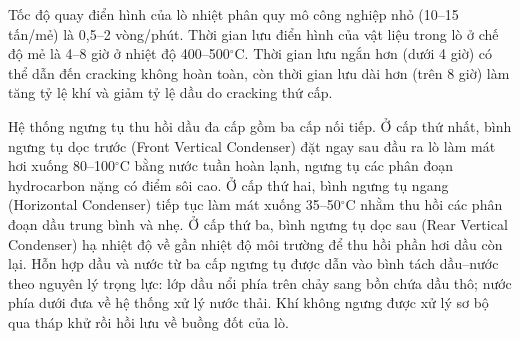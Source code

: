 \documentclass[../main.tex]{subfiles}
\begin{document}
Tốc độ quay điển hình của lò nhiệt phân quy mô công nghiệp nhỏ (10--15 tấn/mẻ) là 0,5--2 vòng/phút. Thời gian lưu điển hình của vật liệu trong lò ở chế độ mẻ là 4--8 giờ ở nhiệt độ 400--500$^\circ\mathrm{C}$. Thời gian lưu ngắn hơn (dưới 4 giờ) có thể dẫn đến cracking không hoàn toàn, còn thời gian lưu dài hơn (trên 8 giờ) làm tăng tỷ lệ khí và giảm tỷ lệ dầu do cracking thứ cấp.

\begin{table}[H]
\centering
\caption{Thông số thiết kế lò nhiệt phân quay}
\label{tab:thong-so-lo-nhiet-phan-quay}
\setlength{\tabcolsep}{5pt}
\end{table}

Hệ thống ngưng tụ thu hồi dầu đa cấp gồm ba cấp nối tiếp. Ở cấp thứ nhất, bình ngưng tụ dọc trước (Front Vertical Condenser) đặt ngay sau đầu ra lò làm mát hơi xuống 80--100$^\circ\mathrm{C}$ bằng nước tuần hoàn lạnh, ngưng tụ các phân đoạn hydrocarbon nặng có điểm sôi cao. Ở cấp thứ hai, bình ngưng tụ ngang (Horizontal Condenser) tiếp tục làm mát xuống 35--50$^\circ\mathrm{C}$ nhằm thu hồi các phân đoạn dầu trung bình và nhẹ. Ở cấp thứ ba, bình ngưng tụ dọc sau (Rear Vertical Condenser) hạ nhiệt độ về gần nhiệt độ môi trường để thu hồi phần hơi dầu còn lại. Hỗn hợp dầu và nước từ ba cấp ngưng tụ được dẫn vào bình tách dầu--nước theo nguyên lý trọng lực: lớp dầu nổi phía trên chảy sang bồn chứa dầu thô; nước phía dưới đưa về hệ thống xử lý nước thải. Khí không ngưng được xử lý sơ bộ qua tháp khử  rồi hồi lưu về buồng đốt của lò.
\end{document}
